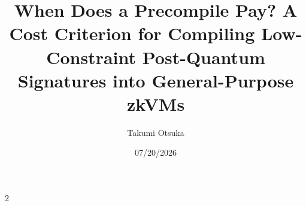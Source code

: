 \documentclass[a4j, 9pt,uplatex,dvipdfmx]{jsarticle}
\date{07/20/2026} %
\author{Takumi Otsuka}
\title{When Does a Precompile Pay? A Cost Criterion for Compiling Low-Constraint Post-Quantum Signatures into General-Purpose zkVMs}
\begin{document}
    \maketitle

    \begin{multicols*}
        {2}
		
        
        
        
        
        



		\printbibliography[title=参考文献]
	\end{multicols*}
\end{document}
